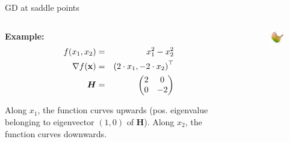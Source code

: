 \documentclass[11pt,compress,t,notes=noshow, xcolor=table]{beamer}
\begin{document}
\begin{vbframe}{GD at saddle points}
	
	\begin{columns}
		\begin{column}{0.48\textwidth}
			\textbf{Example: }
			\begin{eqnarray*}
				f(x_1, x_2) &=& x_1^2 - x_2^2 \\
				\nabla f(\mathbf{x}) &=& \left(2 \cdot x_1, - 2 \cdot x_2\right)^\top \\
				\bm{H} &=& \begin{pmatrix} 2 & 0 \\ 0 & - 2\end{pmatrix}
			\end{eqnarray*}

			Along $x_1$, the function curves upwards (pos. eigenvalue belonging to eigenvector $(1, 0)$ of $\bm{H}$). Along $x_2$, the function curves downwards. 
			
		\end{column}
		\begin{column}{0.48\textwidth}
			\begin{figure}
				\centering
				\includegraphics[width=4cm]{figure_man/saddlepoint.png}
			\end{figure} 
		\end{column}	
	\end{columns}
	
\end{vbframe}

\end{document}
